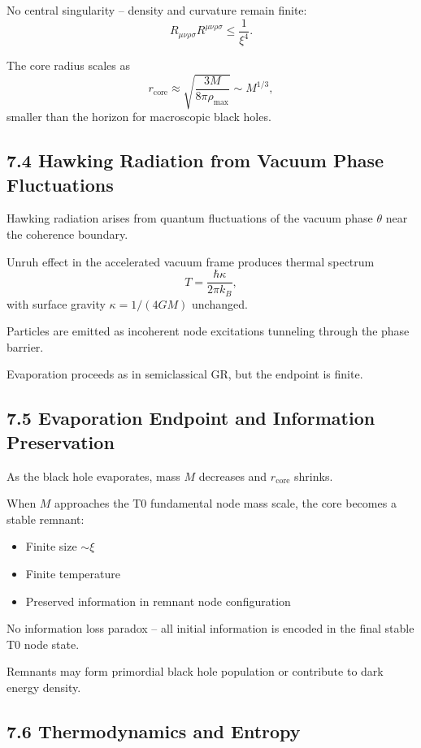 \documentclass[12pt,a4paper]{article}
\begin{document}
	No central singularity – density and curvature remain finite:
	\[
	R_{\mu\nu\rho\sigma} R^{\mu\nu\rho\sigma} \leq \frac{1}{\xi^4}.
	\]
	
	The core radius scales as
	\[
	r_{\text{core}} \approx \sqrt{\frac{3M}{8\pi \rho_{\text{max}}}} \sim M^{1/3},
	\]
	smaller than the horizon for macroscopic black holes.
	
	\subsection{7.4 Hawking Radiation from Vacuum Phase Fluctuations}
	
	Hawking radiation arises from quantum fluctuations of the vacuum phase $\theta$ near the coherence boundary.
	
	Unruh effect in the accelerated vacuum frame produces thermal spectrum
	\[
	T = \frac{\hbar \kappa}{2\pi k_B},
	\]
	with surface gravity $\kappa = 1/(4GM)$ unchanged.
	
	Particles are emitted as incoherent node excitations tunneling through the phase barrier.
	
	Evaporation proceeds as in semiclassical GR, but the endpoint is finite.
	
	\subsection{7.5 Evaporation Endpoint and Information Preservation}
	
	As the black hole evaporates, mass $M$ decreases and $r_{\text{core}}$ shrinks.
	
	When $M$ approaches the T0 fundamental node mass scale, the core becomes a stable remnant:
	\begin{itemize}
		\item Finite size $\sim \xi$
		\item Finite temperature
		\item Preserved information in remnant node configuration
	\end{itemize}
	
	No information loss paradox – all initial information is encoded in the final stable T0 node state.
	
	Remnants may form primordial black hole population or contribute to dark energy density.
	
	\subsection{7.6 Thermodynamics and Entropy}
	
\end{document}
